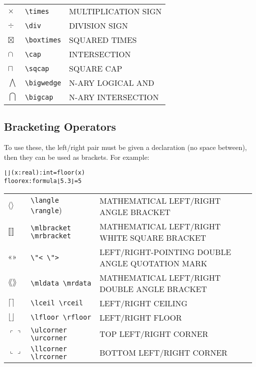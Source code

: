 \begin{center}
\begin{xtabular}{|ll>{\smaller\ttfamily}l|}
  $×$ & \verb|\times| & MULTIPLICATION SIGN \\
  $÷$ & \verb|\div| & DIVISION SIGN \\
  $⊠$ & \verb|\boxtimes| & SQUARED TIMES \\
  $∩$ & \verb|\cap| & INTERSECTION \\
  $⊓$ & \verb|\sqcap| & SQUARE CAP \\
  $⋀$ & \verb|\bigwedge| & N-ARY LOGICAL AND \\
  $⋂$ & \verb|\bigcap| & N-ARY INTERSECTION \\
\end{xtabular}
\end{center}

\subsection{Bracketing Operators}

To use these, the left/right pair must be given a declaration (no space
between), then they can be used as brackets.  For example:
\begin{alltt}
  ⌊⌋(x: real): int = floor(x)
  floorex: formula ⌊5.3⌋ = 5
\end{alltt}

\begin{center}
\smaller
{} \label{unicode:brackets}
\begin{tabular}{|ll>{\smaller\ttfamily}l|}\hline
$⟨ ⟩$ & \verb|\langle \rangle|) & MATHEMATICAL LEFT/RIGHT ANGLE BRACKET \\
$⟦ ⟧$ & \verb|\mlbracket \mrbracket| & MATHEMATICAL LEFT/RIGHT WHITE SQUARE BRACKET \\
$« »$ & \verb|\"< \">| & LEFT/RIGHT-POINTING DOUBLE ANGLE QUOTATION MARK\\
$⟪ ⟫$ & \verb|\mldata \mrdata| & MATHEMATICAL LEFT/RIGHT DOUBLE ANGLE BRACKET \\
$⌈ ⌉$ & \verb|\lceil \rceil| & LEFT/RIGHT CEILING \\
$⌊ ⌋$ & \verb|\lfloor \rfloor| & LEFT/RIGHT FLOOR \\
$⌜ ⌝$ & \verb|\ulcorner \urcorner| & TOP LEFT/RIGHT CORNER \\
$⌞ ⌟$ & \verb|\llcorner \lrcorner| & BOTTOM LEFT/RIGHT CORNER \\ \hline
\end{tabular}
\end{center}

